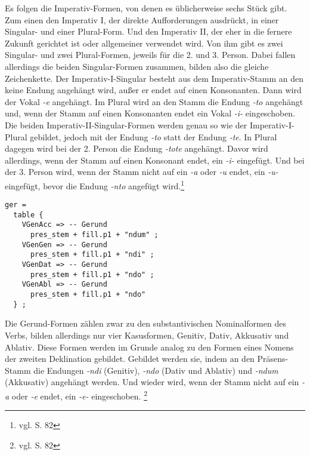 Es folgen die Imperativ-Formen, von denen es üblicherweise sechs Stück gibt. Zum einen den Imperativ I, der direkte Aufforderungen ausdrückt, in einer Singular- und einer Plural-Form. Und den Imperativ II, der eher in die fernere Zukunft gerichtet ist oder allgemeiner verwendet wird. Von ihm gibt es zwei Singular- und zwei Plural-Formen, jeweils für die 2. und 3. Person. Dabei fallen allerdings die beiden Singular-Formen zusammen, bilden also die gleiche Zeichenkette. Der Imperativ-I-Singular besteht aus dem Imperativ-Stamm an den keine Endung angehängt wird, außer er endet auf einen Konsonanten. Dann wird der Vokal \textit{-e} angehängt. Im Plural wird an den Stamm die Endung \textit{-to} angehängt und, wenn der Stamm auf einen Konsonanten endet ein Vokal \textit{-i-} eingeschoben. Die beiden Imperativ-II-Singular-Formen werden genau so wie der Imperativ-I-Plural gebildet, jedoch mit der Endung \textit{-to} statt der Endung \textit{-te}. In Plural dagegen wird bei der 2. Person die Endung \textit{-tote} angehängt. Davor wird allerdings, wenn der Stamm auf einen Konsonant endet, ein \textit{-i-} eingefügt. Und bei der 3. Person wird, wenn der Stamm nicht auf ein \textit{-a} oder \textit{-u} endet, ein \textit{-u-} eingefügt, bevor die Endung \textit{-nto} angefügt wird.\footnote{vgl. \cite{BAYER-LINDAUER1994} S. 82} \par
\begin{lstlisting}[float=h!tp,caption={Ausschnitt aus der Funktion \texttt{mkVerb} um Gerundiv-Verbformen zu bilden (vgl. \textbf{ResLat.gf})},label={GF-Res-MkVerb-Ger},basicstyle=\small]
ger = 
  table {
    VGenAcc => -- Gerund
      pres_stem + fill.p1 + "ndum" ;
    VGenGen => -- Gerund
      pres_stem + fill.p1 + "ndi" ;
    VGenDat => -- Gerund
      pres_stem + fill.p1 + "ndo" ;
    VGenAbl => -- Gerund
      pres_stem + fill.p1 + "ndo" 
  } ;
\end{lstlisting}
Die Gerund-Formen zählen zwar zu den substantivischen Nominalformen des Verbs, bilden allerdings nur vier Kasusformen, Genitiv, Dativ, Akkusativ und Ablativ. Diese Formen werden im Grunde analog zu den Formen eines Nomens der zweiten Deklination gebildet. Gebildet werden sie, indem an den Präsens-Stamm die Endungen \textit{-ndi} (Genitiv), \textit{-ndo} (Dativ und Ablativ) und \textit{-ndum} (Akkusativ) angehängt werden. Und wieder wird, wenn der Stamm nicht auf ein \textit{-a} oder \textit{-e} endet, ein \textit{-e-} eingeschoben. \footnote{vgl. \cite{BAYER-LINDAUER1994} S. 82} \par
